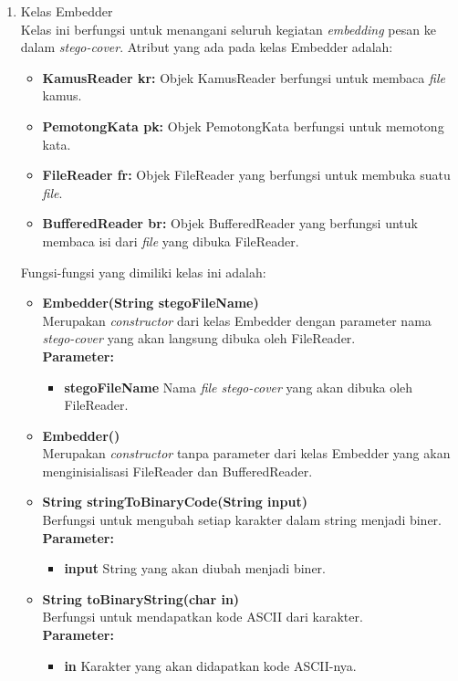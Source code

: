 \begin{enumerate}
	\item Kelas Embedder\\
	Kelas ini berfungsi untuk menangani seluruh kegiatan \textit{embedding} pesan ke dalam \textit{stego-cover}. Atribut yang ada pada kelas Embedder adalah:
	\begin{itemize}
		\item \textbf{KamusReader kr:} Objek KamusReader berfungsi untuk membaca \textit{file} kamus.
		\item \textbf{PemotongKata pk:} Objek PemotongKata berfungsi untuk memotong kata.
		\item \textbf{FileReader fr:} Objek FileReader yang berfungsi untuk membuka suatu \textit{file}.
		\item \textbf{BufferedReader br:} Objek BufferedReader yang berfungsi untuk membaca isi dari \textit{file} yang dibuka FileReader.
	\end{itemize}
	
	Fungsi-fungsi yang dimiliki kelas ini adalah:
	
	\begin{itemize}
		\item \textbf{Embedder(String stegoFileName)}\\
		Merupakan \textit{constructor} dari kelas Embedder dengan parameter nama \textit{stego-cover} yang akan langsung dibuka oleh FileReader.\\
		\textbf{Parameter:}
		\begin{itemize}
			\item \textbf{stegoFileName} Nama \textit{file stego-cover} yang akan dibuka oleh FileReader.
		\end{itemize}
		
		\item \textbf{Embedder()}\\
		Merupakan \textit{constructor} tanpa parameter dari kelas Embedder yang akan menginisialisasi FileReader dan BufferedReader.
		
		\item \textbf{String stringToBinaryCode(String input)}\\
		Berfungsi untuk mengubah setiap karakter dalam string menjadi biner.\\
		\textbf{Parameter:}
		\begin{itemize}
			\item \textbf{input} String yang akan diubah menjadi biner.
		\end{itemize}
		
		\item \textbf{String toBinaryString(char in)}\\
		Berfungsi untuk mendapatkan kode ASCII dari karakter.\\
		\textbf{Parameter:}
		\begin{itemize}
			\item \textbf{in} Karakter yang akan didapatkan kode ASCII-nya.
		\end{itemize}
		

\end{itemize}
\end{enumerate}
